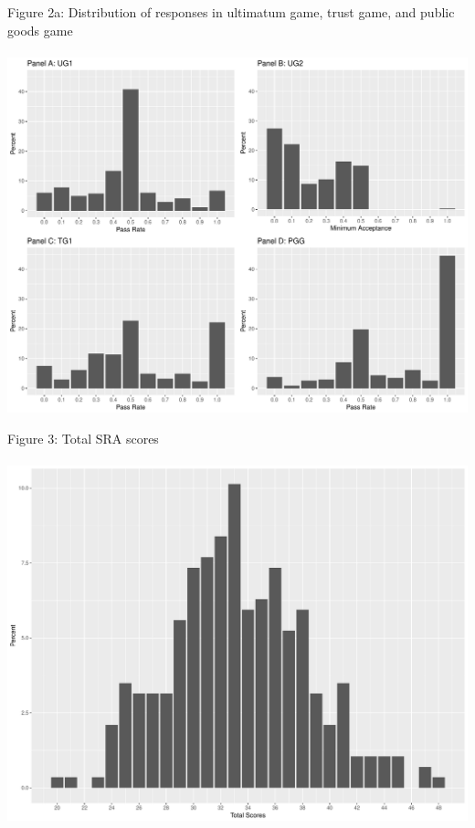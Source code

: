 \documentclass{article}
\begin{document}
Figure 2a: Distribution of responses in ultimatum game, trust game, and public goods game \\ \\
\includegraphics[scale=0.5]{Figure2a.pdf}

Figure 3: Total SRA scores\\ \\
\includegraphics[scale=0.35]{SRAimg}\\
\end{document}
